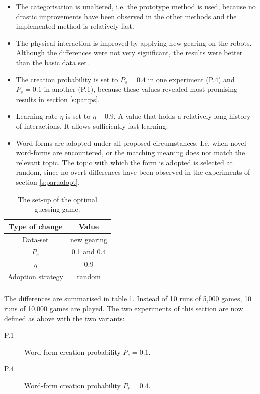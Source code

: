 \begin{itemize}
\item The categorisation is unaltered, i.e. the prototype method is used, because no drastic improvements have been observed in the other methods and the implemented method is relatively fast.

\item The physical interaction is improved by applying new gearing on the robots. Although the differences were not very significant, the results were better than the basic data set.

\item The creation probability is set to $P_s=0.4$ in one experiment (P.4) and $P_s=0.1$ in another (P.1), because these values revealed most promising results in section \ref{s:par:ps}.

\item Learning rate $\eta$ is set to $\eta-0.9$. A value that holds a relatively long history of interactions. It allows sufficiently fast learning.

\item Word-forms are adopted under all proposed circumstances. I.e. when novel word-forms are encountered, or the matching meaning does not match the relevant topic. The topic with which the form is adopted is selected at random, since no overt differences have been observed in the experiments of section \ref{s:par:adopt}.
\end{itemize}


\begin{table}
\centering
\begin{tabular}{cc}
\lsptoprule
Type of change & Value\\\midrule
Data-set & new gearing\\%
$P_s$ & 0.1 and 0.4\\%
$\eta$ & 0.9\\%
Adoption strategy & random\\%
\lspbottomrule
\end{tabular}
\caption{The set-up of the optimal guessing game.}
\label{t:opt:gg1}
\end{table}

The differences are summarised in table \ref{t:opt:gg1}. Instead of 10 runs of 5,000 games, 10 runs of 10,000 games are played. The two experiments of this section are now defined as above with the two variants:

\begin{description}
\item[P.1] Word-form creation probability $P_s=0.1$.
\item[P.4] Word-form creation probability $P_s=0.4$.
\end{description}


